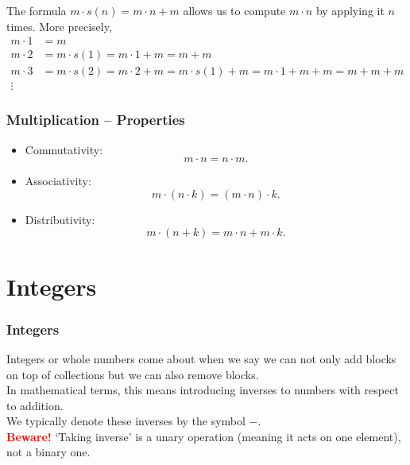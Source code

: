 \documentclass[aspectratio=169,11pt,usenames,dvipsnames,handout]{beamer}
\begin{document}
\begin{frame}
\begin{figure}[ht]
\begin{subfigure}[b]{.25\textwidth}
  \end{subfigure}
 \end{figure}
 \pause
 The formula $m \cdot s(n) = m \cdot n + m$ allows us to compute $m \cdot n$ by
 applying it $n$ times.
 \pause
 More precisely,
 \begin{align*}
  m \cdot 1 &= m\\
  m \cdot 2 &= m \cdot s(1) = m \cdot 1 + m = m + m\\
  m \cdot 3 &= m \cdot s(2) = m \cdot 2 + m = m \cdot s(1) + m = m \cdot 1 + m +
  m = m + m + m\\
  \vdots&
 \end{align*}
\end{frame}

\begin{frame}
 \frametitle{Multiplication -- Properties}
 \begin{itemize}
  \item \alert{Commutativity}:
  \[
   m \cdot n = n \cdot m.
  \]
 \pause
 \item \alert{Associativity}:
  \[
   m \cdot (n \cdot k) = (m \cdot n) \cdot k.
  \]
 \pause
 \item \alert{Distributivity}:
  \[
   m \cdot (n + k) = m \cdot n + m \cdot k.
  \]
 \end{itemize}
\end{frame}

\section{Integers}

\begin{frame}
 \frametitle{Integers}
 \alert{Integers} or \alert{whole numbers} come about when we say we can not
 only add blocks on top of collections but we can also \alert{remove}
 blocks.\pause\\
 In mathematical terms, this means introducing \alert{inverses} to numbers
 \alert{with respect to addition}.\pause\\
 We typically denote these inverses by the symbol $-$.\pause\\
 \textcolor{Red}{\textbf{Beware!}} `Taking inverse' is a \alert{unary} operation
 (meaning it acts on \alert{one} element), not a binary one.
\end{frame}
\end{document}
